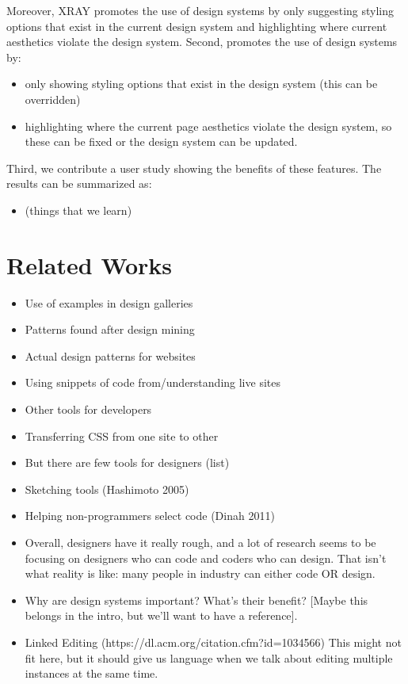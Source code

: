 \documentclass{sigchi}
\begin{document}
Moreover, XRAY promotes the use of design systems by only suggesting styling options that exist in the current design system and highlighting where current aesthetics violate the design system. 
Second, promotes the use of design systems by: 
\begin{itemize}
    \item only showing styling options that exist in the design system (this can be overridden) 
    \item highlighting where the current page aesthetics violate the design system, so these can be fixed or the design system can be updated.
\end{itemize}{}

Third, we contribute a user study showing the benefits of these features. The results can be summarized as: 
\begin{itemize}
    \item (things that we learn)
\end{itemize}

\section{Related Works}
\begin{itemize}
    \item Use of examples in design galleries
    \item Patterns found after design mining
    \item Actual design patterns for websites
    \item Using snippets of code from/understanding live sites
    \item Other tools for developers
    \item Transferring CSS from one site to other
    \item But there are few tools for designers (list)
    \item Sketching tools (Hashimoto 2005)
    \item Helping non-programmers select code (Dinah 2011)
    \item Overall, designers have it really rough, and a lot of research seems to be focusing on designers who can code and coders who can design. That isn’t what reality is like: many people in industry can either code OR design. 
    \item Why are design systems important? What’s their benefit? [Maybe this belongs in the intro, but we’ll want to have a reference].
    \item Linked Editing (https://dl.acm.org/citation.cfm?id=1034566) This might not fit here, but it should give us language when we talk about editing multiple instances at the same time.
\end{itemize}
\end{document}
